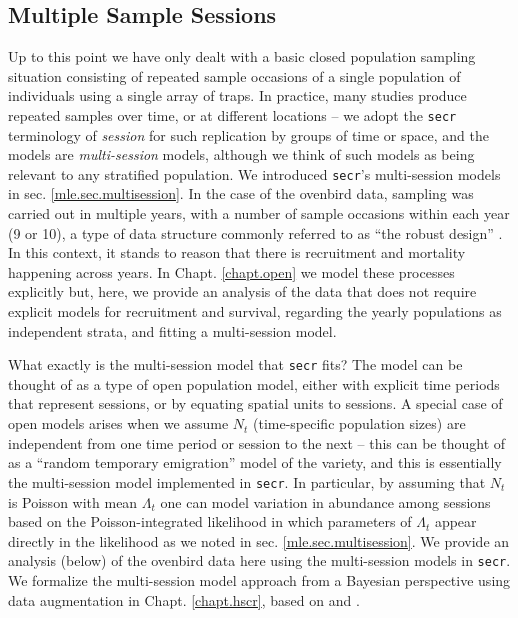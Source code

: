 \subsection{Multiple Sample Sessions}

Up to this point we have only dealt with a basic closed population
sampling situation consisting of repeated sample occasions of a single
population of individuals using a single array of traps. In practice,
many studies produce repeated samples over time, or at different
locations -- we adopt the \mbox{\tt secr} terminology of {\it session}
for such replication by groups of time or space, and the models are
{\it multi-session} models, although we think of such models as being
relevant to any stratified population. We introduced \mbox{\tt secr}'s
multi-session models in sec. \ref{mle.sec.multisession}.  In the case
of the ovenbird data, sampling was carried out in multiple years, with
a number of sample occasions within each year (9 or 10), a type of
data structure commonly referred to as ``the robust
design'' \citep{pollock:1982}.  In this context,
it stands to reason that there is recruitment and mortality happening
across years. In Chapt. \ref{chapt.open} we model these processes
explicitly but, here, we provide an analysis of the data that does not
require explicit models for recruitment and survival, regarding the
yearly populations as independent strata, and fitting a multi-session
model.

What exactly is the multi-session model that \mbox{\tt secr} fits? The
model can be thought of as a type of open population model, either
with explicit time periods that represent sessions, or by equating
spatial units to sessions.
A special case of open models arises when we assume $N_{t}$
(time-specific population sizes) are
independent from one time period or session to the next -- this can be
thought of as a ``random temporary emigration'' model of the
\citet{kendall_etal:1997} variety, and this is essentially the
multi-session model implemented in \mbox{\tt secr}.  In particular, by
assuming that $N_{t}$ is Poisson with mean $\Lambda_{t}$ one can model
variation in abundance among sessions based on the Poisson-integrated
likelihood in which parameters of $\Lambda_{t}$ appear directly in the
likelihood as we noted in sec. \ref{mle.sec.multisession}.  We provide
an analysis (below) of the ovenbird data here using the multi-session models
in  \mbox{\tt secr}.
We formalize the multi-session model approach from a Bayesian
perspective using data augmentation
in Chapt. \ref{chapt.hscr}, based on \citet{converse_royle:2012} and
\citet{converse_royle:2013}.

